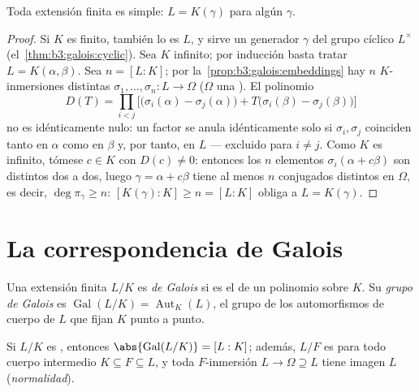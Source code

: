 \begin{theorem}\label{thm:b3:galois:primitive}
Toda extensión finita \emph{}
es simple: $L =
K(\gamma)$ para algún $\gamma$.
\end{theorem}

\begin{proof}
Si $K$ es finito, también lo es $L$, y sirve un generador $\gamma$ del
grupo cíclico $L^\times$ (el~\cref{thm:b3:galois:cyclic}). Sea $K$
infinito; por inducción basta tratar $L =
K(\alpha, \beta)$. Sea $n = [L:K]$; por
la~\cref{prop:b3:galois:embeddings} hay $n$ $K$-inmersiones distintas
$\sigma_1, \dots, \sigma_n \colon L \to \Omega$ ($\Omega$ una
). El polinomio
\[
D(T)=\prod_{i<j}\bigl[\bigl(\sigma_i(\alpha)-\sigma_j(\alpha)
\bigr) + T\bigl(\sigma_i(\beta) - \sigma_j(\beta)\bigr)\bigr]
\]
no es idénticamente nulo: un factor se anula idénticamente solo si
$\sigma_i, \sigma_j$ coinciden tanto en $\alpha$ como en $\beta$ y, por
tanto, en $L$ --- excluido para $i \neq j$. Como $K$ es infinito, tómese
$c \in
K$ con $D(c) \ne 0$: entonces los $n$ elementos $\sigma_i(\alpha +
c\beta)$ son distintos dos a dos, luego $\gamma = \alpha + c\beta$ tiene
al menos $n$ conjugados distintos en $\Omega$, es decir,
$\deg \pi_\gamma \geq n$: $[K(\gamma):K] \geq n = [L:K]$ obliga a
$L = K(\gamma)$.
\end{proof}

\section{La correspondencia de Galois}

\begin{definition}\label{def:b3:galois:galois}
Una extensión finita $L/K$ es \emph{de Galois} si es el  de un polinomio
\emph{} sobre $K$. Su
\emph{grupo de Galois} es
$\operatorname{Gal}(L/K) = \operatorname{Aut}_K(L)$, el grupo de los
automorfismos de cuerpo de $L$ que fijan $K$ punto a punto.
\end{definition}

\begin{proposition}\label{prop:b3:galois:galoisorder}
Si $L/K$ es , entonces
$\abs{\operatorname{Gal}(L/K)} =
[L:K]$; además, $L/F$ es  para
todo cuerpo intermedio $K
\subseteq F \subseteq L$, y toda $F$-inmersión $L \to \Omega
\supseteq L$ tiene imagen $L$ (\emph{normalidad}).
\end{proposition}


